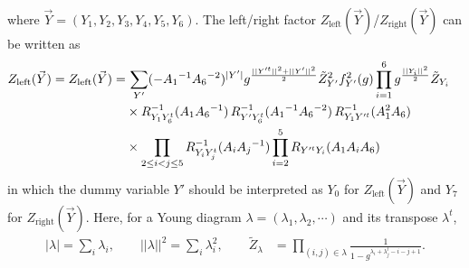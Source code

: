 \documentclass[letterpaper, 11pt]{article}
\newcommand{\nn}{\nonumber}
\begin{document}
{\begin{align}
\end{align}
where $\vec{Y}=(Y_1, Y_2, Y_3, Y_4, Y_5, Y_6)$. The left/right factor 
$Z_{\text{left}}(\vec{Y})$/$Z_{\text{right}}(\vec{Y})$ can be written as 
\begin{align}
\begin{split}
Z_{\text{left}}(\vec{Y}) = Z_{\text{left}}(\vec{Y})=& \,
\sum_{Y'} ( - A_1{}^{-1} A_6{}^{-2})^{|Y'|} 
g^{\frac{||Y'^t||^2+||Y'||^2}{2}} \tilde{Z}_{Y'}^2 f_{Y'}^2(g)
\prod_{i=1}^6 g^{\frac{||Y_i||^2}{2}} \tilde{Z}_{Y_i} 
\cr 
& 
\times 
R_{Y_1 Y_6^t}^{-1} (A_1 A_6{}^{-1})\,R_{Y' Y_6^t}^{-1} (A_1{}^{-1} A_6{}^{-2})\,R_{Y_1Y'^t }^{-1} (A_1^2A_6) \cr 
& 
\times  
 \prod_{2 \le i <  j \le 5} R_{Y_i Y_j^t}^{-1} (A_i A_j{}^{-1})
 \prod_{i=2}^5 R_{Y'^t Y_i} (A_1 A_i  A_6) 
\end{split}
\end{align}
in which the dummy variable $Y'$ should be interpreted as $Y_0$ for $Z_{\text{left}}(\vec{Y})$ and  $Y_7$ for $Z_{\text{right}}(\vec{Y})$. %
Here, for a Young diagram $\lambda = (\lambda_1, \lambda_2, \cdots)$ and its transpose $\lambda^t$,  
\begin{align}
  |\lambda|=\sum_{i}\lambda_i, \qquad ||\lambda||^2 =\sum_{i}\lambda_i^2, \qquad  \tilde{Z}_{\lambda} 
&= \prod_{(i,j) \in \lambda} \frac{1}{1 - g^{\lambda_i + \lambda^t_j - i - j +1} }. 	

\end{align}}
\end{document}
